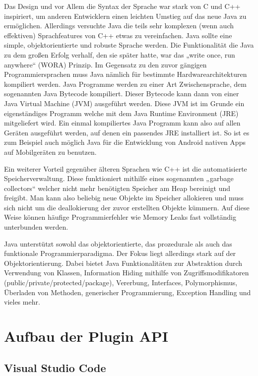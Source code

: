 Das Design und vor Allem die Syntax der Sprache war stark von C und C++ inspiriert, 
um anderen Entwicklern einen leichten Umstieg auf das neue Java zu ermöglichen. 
Allerdings versuchte Java die teils sehr komplexen (wenn auch effektiven) 
Sprachfeatures von C++ etwas zu vereinfachen. Java sollte eine simple, objektorientierte 
und robuste Sprache werden. Die Funktionalität die Java zu dem großen Erfolg verhalf, 
den sie später hatte, war das „write once, run anywhere“ (WORA) Prinzip. Im Gegensatz 
zu den zuvor gängigen Programmiersprachen muss Java nämlich für bestimmte 
Hardwarearchitekturen kompiliert werden. Java Programme werden zu einer Art 
Zwischensprache, dem sogenannten Java Bytecode kompiliert. Dieser Bytecode
kann dann von einer Java Virtual Machine (JVM) ausgeführt werden. Diese JVM ist
im Grunde ein eigenständiges Programm welche mit dem Java Runtime Environment 
(JRE) mitgeliefert wird. Ein einmal kompiliertes Java Programm kann also auf 
allen Geräten ausgeführt werden, auf denen ein passendes JRE installiert ist. 
So ist es zum Beispiel auch möglich Java für die Entwicklung von Android nativen
Apps auf Mobilgeräten zu benutzen.

Ein weiterer Vorteil gegenüber älteren Sprachen wie C++ ist die
automatisierte Speicherverwaltung. Diese funktioniert mithilfe eines 
sogenannten „garbage collectors“ welcher nicht mehr benötigten Speicher
am Heap bereinigt und freigibt. Man kann also beliebig neue Objekte im Speicher
allokieren und muss sich nicht um die deallokierung der zuvor erstellten Objekte
kümmern. Auf diese Weise können häufige Programmierfehler wie Memory Leaks fast 
vollständig unterbunden werden.

Java unterstützt sowohl das objektorientierte, das prozedurale als auch das funktionale 
Programmierparadigma. Der Fokus liegt allerdings stark auf der Objektorientierung. 
Dabei bietet Java Funktionalitäten zur Abstraktion durch Verwendung von Klassen, Information Hiding
mithilfe von Zugriffsmodifikatoren (public/private/protected/package), Vererbung, 
Interfaces, Polymorphismus, Überladen von Methoden, generischer Programmierung, 
Exception Handling und vieles mehr.

\section{Aufbau der Plugin API}
\label{sec:AufbauDerPluginAPI}

\subsection{Visual Studio Code}

